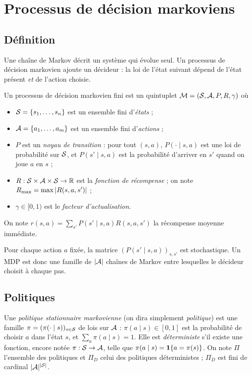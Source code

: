 \section{Processus de décision markoviens}\label{sec-mdp}

\subsection{Définition}

Une chaîne de Markov décrit un système qui évolue seul. Un processus de décision markovien ajoute un décideur : la loi de l'état suivant dépend de l'état présent \emph{et} de l'action choisie.

\begin{definition}\label{def-mdp}
Un processus de décision markovien fini est un quintuplet $\mathcal{M}=(\mathcal{S},\mathcal{A},P,R,\gamma)$ où
\begin{itemize}
\item $\mathcal{S}=\{s_1,\dots,s_n\}$ est un ensemble fini d'\emph{états} ;
\item $\mathcal{A}=\{a_1,\dots,a_m\}$ est un ensemble fini d'\emph{actions} ;
\item $P$ est un \emph{noyau de transition} : pour tout $(s,a)$, $P(\cdot\mid s,a)$ est une loi de probabilité sur $\mathcal{S}$, et $P(s'\mid s,a)$ est la probabilité d'arriver en $s'$ quand on joue $a$ en $s$ ;
\item $R:\mathcal{S}\times\mathcal{A}\times\mathcal{S}\to\mathbb{R}$ est la \emph{fonction de récompense} ; on note $R_{\max}=\max\left\lvert R(s,a,s') \right\rvert$ ;
\item $\gamma\in[0,1)$ est le \emph{facteur d'actualisation}.
\end{itemize}
On note $r(s,a)=\sum_{s'}P(s'\mid s,a)R(s,a,s')$ la récompense moyenne immédiate.
\end{definition}

Pour chaque action $a$ fixée, la matrice $(P(s'\mid s,a))_{s,s'}$ est stochastique. Un MDP est donc une famille de $|\mathcal{A}|$ chaînes de Markov entre lesquelles le décideur choisit à chaque pas.

\subsection{Politiques}

\begin{definition}[Politique]
Une \emph{politique stationnaire markovienne} (on dira simplement \emph{politique}) est une famille $\pi=(\pi(\cdot\mid s))_{s\in\mathcal{S}}$ de lois sur $\mathcal{A}$ : $\pi(a\mid s)\in[0,1]$ est la probabilité de choisir $a$ dans l'état $s$, et $\sum_a\pi(a\mid s)=1$. Elle est \emph{déterministe} s'il existe une fonction, encore notée $\pi:\mathcal{S}\to\mathcal{A}$, telle que $\pi(a\mid s)=\mathbf{1}\{a=\pi(s)\}$. On note $\Pi$ l'ensemble des politiques et $\Pi_D$ celui des politiques déterministes ; $\Pi_D$ est fini de cardinal $|\mathcal{A}|^{|\mathcal{S}|}$.
\end{definition}


